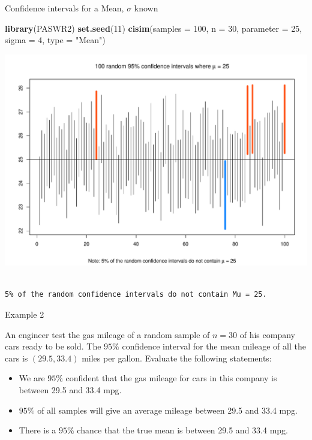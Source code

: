 \documentclass[
  ignorenonframetext,
]{beamer}
\newenvironment{Shaded}{\begin{snugshade}}{\end{snugshade}}
\newcommand{\AttributeTok}[1]{\textcolor[rgb]{0.13,0.29,0.53}{#1}}
\newcommand{\DecValTok}[1]{\textcolor[rgb]{0.00,0.00,0.81}{#1}}
\newcommand{\FunctionTok}[1]{\textcolor[rgb]{0.13,0.29,0.53}{\textbf{#1}}}
\newcommand{\NormalTok}[1]{#1}
\newcommand{\StringTok}[1]{\textcolor[rgb]{0.31,0.60,0.02}{#1}}
\begin{document}
\begin{frame}[fragile]{Confidence intervals for a Mean, \(\sigma\)
known}
\protect\hypertarget{confidence-intervals-for-a-mean-sigma-known-7}{}
\normalsize

\begin{Shaded}
\begin{Highlighting}[]
\FunctionTok{library}\NormalTok{(PASWR2)}
\FunctionTok{set.seed}\NormalTok{(}\DecValTok{11}\NormalTok{)}
\FunctionTok{cisim}\NormalTok{(}\AttributeTok{samples =} \DecValTok{100}\NormalTok{, }\AttributeTok{n =} \DecValTok{30}\NormalTok{, }\AttributeTok{parameter =} \DecValTok{25}\NormalTok{, }\AttributeTok{sigma =} \DecValTok{4}\NormalTok{, }
      \AttributeTok{type =} \StringTok{"Mean"}\NormalTok{)}
\end{Highlighting}
\end{Shaded}

\begin{center}\includegraphics[width=0.6\linewidth,height=0.4\textheight]{Week10A_files/figure-beamer/unnamed-chunk-49-1} \end{center}

\begin{verbatim}

5% of the random confidence intervals do not contain Mu = 25.
\end{verbatim}

\normalsize
\end{frame}

\begin{frame}{Example 2}
\protect\hypertarget{example-2}{}
\begin{tcolorbox}
An engineer test the gas mileage of a random sample of $n=30$ of his company cars ready to be sold. The $95\%$ confidence interval for the mean mileage of all the cars is $(29.5, 33.4)$ miles per gallon. Evaluate the following statements:
\begin{itemize}
\item We are $95\%$ confident that the gas mileage for cars in this company is between 29.5 and 33.4 mpg.

\item $95\%$ of all samples will give an average mileage between 29.5 and 33.4 mpg.

\item There is a $95\%$ chance that the true mean is between 29.5 and 33.4 mpg.
\end{itemize}
\end{tcolorbox}
\end{frame}
\end{document}
